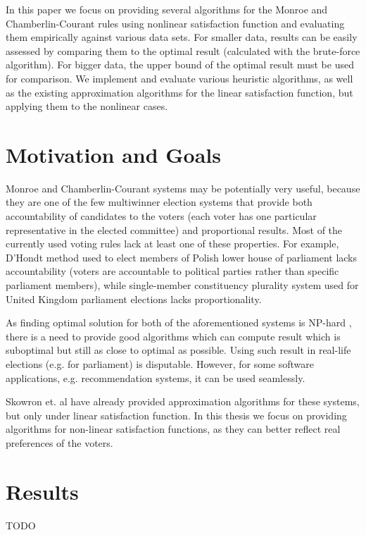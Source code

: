 In this paper we focus on providing several algorithms for the Monroe and Chamberlin-Courant rules using nonlinear satisfaction function and evaluating them empirically against various data sets. For smaller data, results can be easily assessed by comparing them to the optimal result (calculated with the brute-force algorithm). For bigger data, the upper bound of the optimal result must be used for comparison. We implement and evaluate various heuristic algorithms, as well as the existing approximation algorithms for the linear satisfaction function, but applying them to the nonlinear cases.

\section{Motivation and Goals}

Monroe and Chamberlin-Courant systems may be potentially very useful, because they are one of the few multiwinner election systems that provide both accountability of candidates to the voters (each voter has one particular representative in the elected committee) and proportional results. Most of the currently used voting rules lack at least one of these properties. For example, D'Hondt method used to elect members of Polish lower house of parliament lacks accountability (voters are accountable to political parties rather than specific parliament members), while single-member constituency plurality system used for United Kingdom parliament elections lacks proportionality.

As finding optimal solution for both of the aforementioned systems is NP-hard \cite{2}, there is a need to provide good algorithms which can compute result which is suboptimal but still as close to optimal as possible. Using such result in real-life elections (e.g. for parliament) is disputable. However, for some software applications, e.g. recommendation systems, it can be used seamlessly.

Skowron et. al \cite{1} have already provided approximation algorithms for these systems, but only under linear satisfaction function. In this thesis we focus on providing algorithms for non-linear satisfaction functions, as they can better reflect real preferences of the voters.

\section{Results}

TODO
